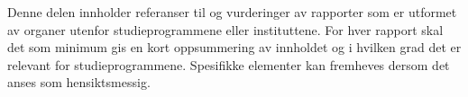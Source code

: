 Denne delen innholder referanser til og vurderinger av rapporter som er utformet av organer utenfor studieprogrammene eller instituttene. For hver rapport skal det som minimum gis en kort oppsummering av innholdet og i hvilken grad det er relevant for studieprogrammene. Spesifikke elementer kan fremheves dersom det anses som hensiktsmessig.
